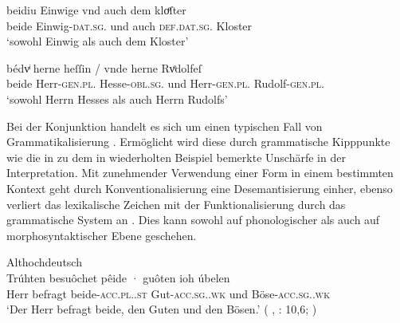 \begin{exe}
\ex \label{ex:caoconjbeide}
	\begin{xlist}
	\ex \label{ex:caoconjbeide_1}
		\gll beidiu Einwige vnd auch dem kloͤſter \\
				beide Einwig-\textsc{dat.sg.\FemF} und auch
				\textsc{def.dat.sg.\NeutM} Kloster \\
		\trans `sowohl Einwig als auch dem Kloster'
			\parencites(Nr.~2925, Landshut, 1298)[219,34]{cao4}

	\ex \label{ex:caoconjbeide_2}
		\gll bédvͥ herne heſſin / vnde herne Rvͦdolfeſ \\
			beide Herr-\textsc{gen.pl.\MascM} Hesse-\textsc{obl.sg.\MascM} {}
				und Herr-\textsc{gen.pl.\MascM} Rudolf-\textsc{gen.pl.\MascM}
				\\
		\trans `sowohl Herrn Hesses als auch Herrn Rudolfs'
			\parencites(Nr.~1318, Freiburg i.\,Br., 1290)[561,11--12]{cao2}
	\end{xlist}
\end{exe}

Bei der Konjunktion  handelt es sich um einen typischen Fall von
Grammatikalisierung \autocite[vgl.][134--188]{lehmann2015}. Ermöglicht wird
diese durch grammatische Kipppunkte wie die in  zu dem
in  wiederholten Beispiel bemerkte Unschärfe in der
Interpretation. Mit zunehmender Verwendung einer Form in einem bestimmten
Kontext geht durch Konventionalisierung eine Desemantisierung einher, ebenso
verliert das lexikalische Zeichen mit der Funktionalisierung durch das
grammatische System an . Dies kann sowohl auf phonologischer als
auch auf morphosyntaktischer Ebene geschehen.

\begin{exe}
\ex \label{ex:beidejohahd_2_copy}
	Althochdeutsch\\
	\gll Trúhten besuôchet pêide · guôten ioh úbelen \\
			Herr befragt beide-\textsc{acc.pl.\MascA.st} {}
				Gut-\textsc{acc.sg.\MascA.wk} und
				Böse-\textsc{acc.sg.\MascA.wk} \\
		\trans `Der Herr befragt beide, den Guten und den Bösen.'
			(%
				, : 10,6;
				\cite[35]{tax1979}%
			)
\end{exe}

